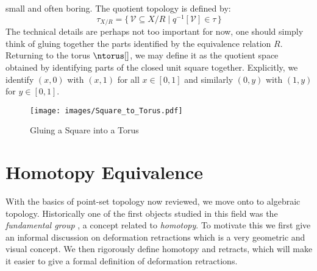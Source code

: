 \documentclass{book}                                                           %
\begin{document}
                small and often boring. The quotient topology is defined by:%
                \begin{equation}
                    \tau_{X/R}=\{\,\mathcal{V}\subseteq{X}/R\;|\;
                        q^{\minus{1}}[\mathcal{V}]\in\tau\,\}
                \end{equation}
                The technical details are perhaps not too important for now, one
                should simply think of gluing together the parts identified by
                the equivalence relation $R$. Returning to the torus
                $\ntorus[]$, we may define it as the quotient space obtained by
                identifying parts of the closed unit square together.
                Explicitly, we identify $(x,0)$ with $(x,1)$ for all $x\in[0,1]$
                and similarly $(0,y)$ with $(1,y)$ for $y\in[0,1]$.
                \begin{figure}[H]
                    \centering
                    \captionsetup{type=figure}
                    \texttt{[image: images/Square\_to\_Torus.pdf]}
                    \caption{Gluing a Square into a Torus}
                    \label{fig:Square_to_Torus}
                \end{figure}
        \section{Homotopy Equivalence}
            With the basics of point-set topology now reviewed, we move onto to
            algebraic topology. Historically one of the first objects studied in
            this field was the \textit{fundamental group}%
            , a concept related to \textit{homotopy}.
            To motivate this we first give an informal discussion on deformation
            retractions which is a very geometric and visual concept. We then
            rigorously define homotopy and retracts, which will make it easier
            to give a formal definition of deformation retractions.
\end{document}
